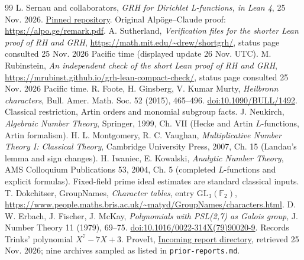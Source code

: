 \documentclass[11pt]{article}
\theoremstyle{remark}\newtheorem{remark}[theorem]{Remark}
\begin{document}
\begin{thebibliography}{99}\small
{} L. Sernau and collaborators, \emph{GRH for Dirichlet L-functions, in Lean 4}, 25 Nov. 2026. \href{https://github.com/lsernau/grh-lean/tree/72fead102f663d5c7a407964a13dc0cf9d977207}{Pinned repository}. Original Alp\"oge--Claude proof: \url{https://alpo.ge/remark.pdf}.
 A. Sutherland, \emph{Verification files for the shorter Lean proof of RH and GRH}, \url{https://math.mit.edu/~drew/shortgrh/}, status page consulted 25 Nov. 2026 Pacific time (displayed update 26 Nov. UTC).
 M. Rubinstein, \emph{An independent check of the short Lean proof of RH and GRH}, \url{https://mrubinst.github.io/grh-lean-compact-check/}, status page consulted 25 Nov. 2026 Pacific time.
 R. Foote, H. Ginsberg, V. Kumar Murty, \emph{Heilbronn characters}, Bull. Amer. Math. Soc. 52 (2015), 465--496. \href{https://doi.org/10.1090/BULL/1492}{doi:10.1090/BULL/1492}. Classical restriction, Artin orders and monomial subgroup facts.
 J. Neukirch, \emph{Algebraic Number Theory}, Springer, 1999, Ch. VII (Hecke and Artin $L$-functions, Artin formalism).
 H. L. Montgomery, R. C. Vaughan, \emph{Multiplicative Number Theory I: Classical Theory}, Cambridge University Press, 2007, Ch. 15 (Landau's lemma and sign changes).
 H. Iwaniec, E. Kowalski, \emph{Analytic Number Theory}, AMS Colloquium Publications 53, 2004, Ch. 5 (completed $L$-functions and explicit formulas). Fixed-field prime ideal estimates are standard classical inputs.
 T. Dokchitser, GroupNames, \emph{Character tables}, entry $\mathrm{GL}_3(\mathbb F_2)$, \url{https://www.people.maths.bris.ac.uk/~matyd/GroupNames/characters.html}.
 D. W. Erbach, J. Fischer, J. McKay, \emph{Polynomials with PSL(2,7) as Galois group}, J. Number Theory 11 (1979), 69--75. \href{https://doi.org/10.1016/0022-314X(79)90020-9}{doi:10.1016/0022-314X(79)90020-9}. Records Trinks' polynomial $X^7-7X+3$.
 ProveIt, \href{https://github.com/VladimirReshetnikov/ProveIt/tree/main/docs/incoming}{Incoming report directory}, retrieved 25 Nov. 2026; nine archives sampled as listed in \texttt{prior-reports.md}.
\end{thebibliography}
\end{document}
